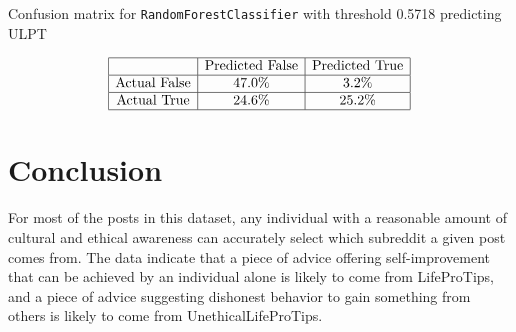 \documentclass{amsart}
\theoremstyle{definition}
\theoremstyle{remark}
\begin{document}
\begin{table}
\caption{Confusion matrix for \texttt{RandomForestClassifier} with threshold 0.5718 predicting ULPT}\label{RF_cm}
\[\begin{array}{|c|c|c|}
\hline
& \text{Predicted False} & \text{Predicted True}\\
\hline
\text{Actual False} & 47.0\% & 3.2\%\\
\hline
\text{Actual True} & 24.6\% & 25.2\%\\
\hline
\end{array}\]
\end{table}







\section{Conclusion}\label{conclusion}

For most of the posts in this dataset, any individual with a reasonable amount of cultural and ethical awareness can accurately select which subreddit a given post comes from.  The data indicate that a piece of advice offering self-improvement that can be achieved by an individual alone is likely to come from LifeProTips, and a piece of advice suggesting dishonest behavior to gain something from others is likely to come from UnethicalLifeProTips. 
\end{document}
